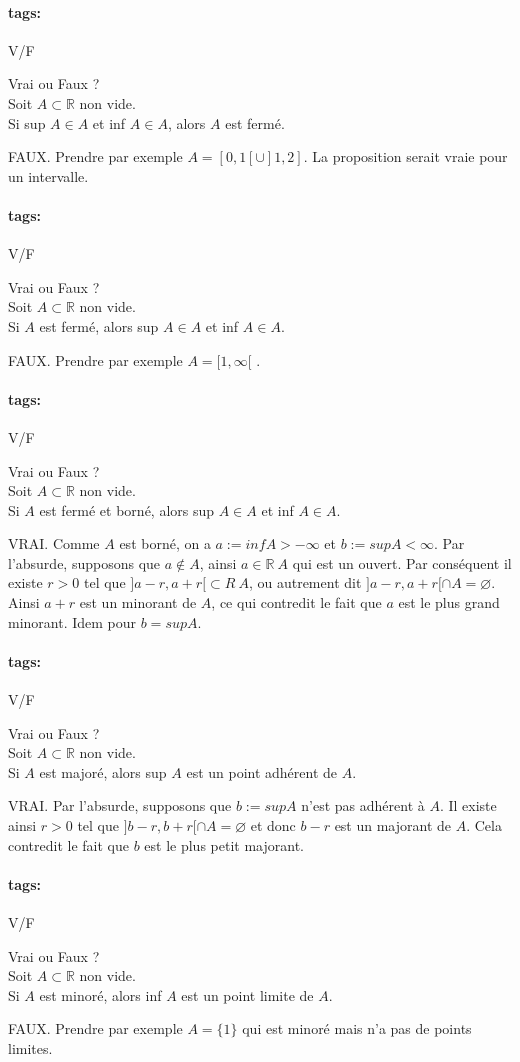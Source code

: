 \documentclass[12pt]{article}
\newcommand*{\xfield}[1]{\begin{mdframed}\centering #1\end{mdframed}\bigskip}
\newenvironment{note}{}{}
\newcommand*{\tags}[1]{\paragraph{tags: }#1}
\begin{document}
\begin{note}
\tags{V/F}
	\xfield{Vrai ou Faux ?\\
Soit $A \subset \mathbb{R}$ non vide.\\
Si sup $A \in A$ et inf $A \in A$, alors $A$ est fermé.}
	\xfield{FAUX.
Prendre par exemple $A = [0, 1[ \cup ]1, 2]$. La proposition serait vraie pour un intervalle.}
\end{note}

\begin{note}
\tags{V/F}
	\xfield{Vrai ou Faux ?\\
Soit $A \subset \mathbb{R}$ non vide.\\
Si $A$ est fermé, alors sup $A \in A$ et inf $A \in A$.}
	\xfield{FAUX.
Prendre par exemple $A = [1, \infty[$ .}
\end{note}

\begin{note}
\tags{V/F}
	\xfield{Vrai ou Faux ?\\
Soit $A \subset \mathbb{R}$ non vide.\\
Si $A$ est fermé et borné, alors sup $A \in A$ et inf $A \in A$.}
	\xfield{VRAI.
Comme $A$ est borné, on a $a := inf A > -\infty$ et $b := sup A < \infty$. Par l’absurde, supposons
que $a \not\in A$, ainsi $a \in \mathbb{R} \ A$ qui est un ouvert. Par conséquent il existe $r > 0$ tel que $]a - r, a + r[ \subset R \ A$, ou autrement dit $]a - r, a + r[ \cap A = \varnothing$. Ainsi $a + r$ est un minorant de $A$, ce qui contredit le fait que $a$ est le plus grand minorant. Idem pour $b = sup A$.}
\end{note}

\begin{note}
	\tags{V/F}
	\xfield{Vrai ou Faux ?\\
Soit $A \subset \mathbb{R}$ non vide.\\
Si $A$ est majoré, alors sup $A$ est un point adhérent de $A$.}
	\xfield{VRAI.
Par l’absurde, supposons que $b := sup A$ n’est pas adhérent à $A$. Il existe ainsi $r > 0$ tel
que $]b - r, b + r[ \cap A = \varnothing$ et donc $b - r$ est un majorant de $A$. Cela contredit le fait que $b$ est le plus petit majorant.}
\end{note}

\begin{note}
\tags{V/F}
	\xfield{Vrai ou Faux ?\\
Soit $A \subset \mathbb{R}$ non vide.\\
Si $A$ est minoré, alors inf $A$ est un point limite de $A$.}
	\xfield{FAUX.
Prendre par exemple $A = \{1\}$ qui est minoré mais n’a pas de points limites.}
\end{note}
\end{document}
